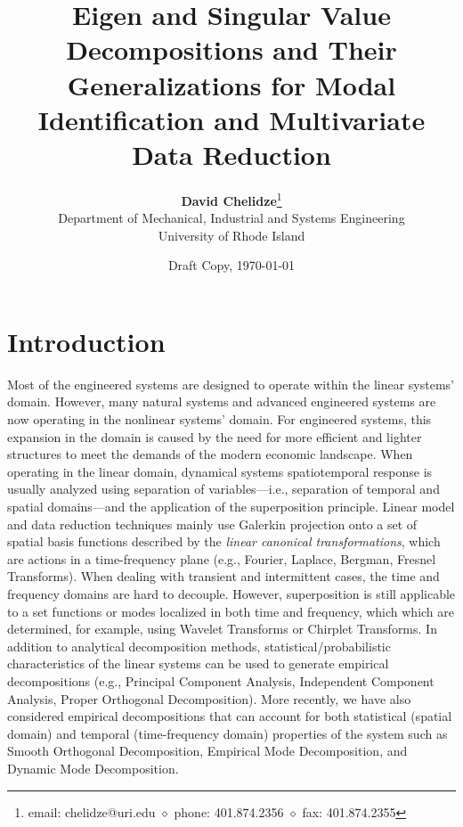 \documentclass[10pt]{article}
\begin{document}
\title{\bf Eigen and Singular Value Decompositions and Their Generalizations for Modal Identification and Multivariate Data Reduction}%
\author{{\bf David Chelidze}\thanks{email: chelidze@uri.edu
$\diamond$ phone: 401.874.2356 $\diamond$ fax: 401.874.2355}\\Department of Mechanical, Industrial and Systems
Engineering\\
University of Rhode Island}%

\date{Draft Copy, \today}%

\maketitle

\begin{abstract}
\end{abstract}

\section{Introduction}

Most of the engineered systems are designed to operate within the linear systems' domain. 
However, many natural systems and advanced engineered systems are now operating in the nonlinear systems' domain.
For engineered systems, this expansion in the domain is caused by the need for more efficient and lighter structures to meet the demands of the modern economic landscape.
When operating in the linear domain, dynamical systems spatiotemporal response is usually analyzed using separation of variables---i.e., separation of temporal and spatial domains---and the application of the superposition principle.
Linear model and data reduction techniques mainly use Galerkin projection onto a set of spatial basis functions described by the {\em linear canonical transformations}, which are actions in a time-frequency plane (e.g., Fourier, Laplace, Bergman, Fresnel Transforms).
When dealing with transient and intermittent cases, the time and frequency domains are hard to decouple. However, superposition is still applicable to a set functions or modes localized in both time and frequency, which which are determined, for example, using Wavelet Transforms or Chirplet Transforms.
In addition to analytical decomposition methods, statistical/probabilistic characteristics of the linear systems can be used to generate empirical decompositions (e.g.,  Principal Component Analysis, Independent Component Analysis, Proper Orthogonal Decomposition).
More recently, we have also considered empirical decompositions that can account for both statistical (spatial domain) and temporal (time-frequency domain) properties of the system such as Smooth Orthogonal Decomposition, Empirical Mode Decomposition, and Dynamic Mode Decomposition.
\end{document}
